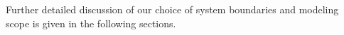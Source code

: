 
Further detailed discussion of our choice of system boundaries and modeling scope is given in the following sections. 


 
\providecommand{\X}{\cellcolor{cellcolor}}
\providecommand{\anonstrut}{\rule{0pt}{5.5pt}}
 
 
